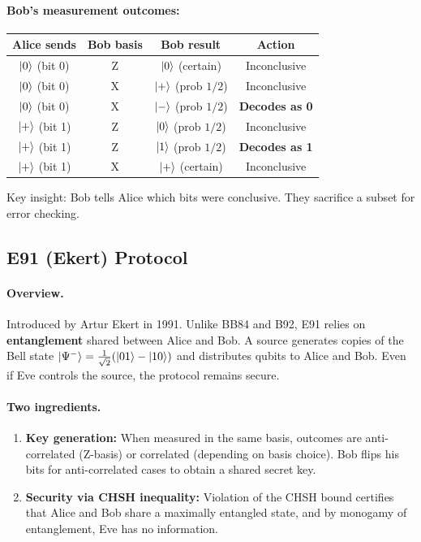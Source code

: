 \documentclass[10pt,a4paper]{article}
\begin{document}
\paragraph{Bob's measurement outcomes:}
\begin{center}
\begin{tabular}{cccc}
Alice sends & Bob basis & Bob result & Action \\\hline
$\ket{0}$ (bit 0) & Z & $\ket{0}$ (certain) & Inconclusive \\
$\ket{0}$ (bit 0) & X & $\ket{+}$ (prob $1/2$) & Inconclusive \\
$\ket{0}$ (bit 0) & X & $\ket{-}$ (prob $1/2$) & \textbf{Decodes as 0} \\
$\ket{+}$ (bit 1) & Z & $\ket{0}$ (prob $1/2$) & Inconclusive \\
$\ket{+}$ (bit 1) & Z & $\ket{1}$ (prob $1/2$) & \textbf{Decodes as 1} \\
$\ket{+}$ (bit 1) & X & $\ket{+}$ (certain) & Inconclusive \\
\end{tabular}
\end{center}

Key insight: Bob tells Alice which bits were conclusive. They sacrifice a subset for error checking.

\subsection{E91 (Ekert) Protocol}

\paragraph{Overview.} Introduced by Artur Ekert in 1991. Unlike BB84 and B92, E91 relies on \textbf{entanglement} shared between Alice and Bob. A source generates copies of the Bell state $\ket{\Psi^-}=\frac{1}{\sqrt{2}}(\ket{01}-\ket{10})$ and distributes qubits to Alice and Bob. Even if Eve controls the source, the protocol remains secure.

\paragraph{Two ingredients.}
\begin{enumerate}[nosep]
\item \textbf{Key generation:} When measured in the same basis, outcomes are anti-correlated (Z-basis) or correlated (depending on basis choice). Bob flips his bits for anti-correlated cases to obtain a shared secret key.
\item \textbf{Security via CHSH inequality:} Violation of the CHSH bound certifies that Alice and Bob share a maximally entangled state, and by monogamy of entanglement, Eve has no information.
\end{enumerate}
\end{document}
